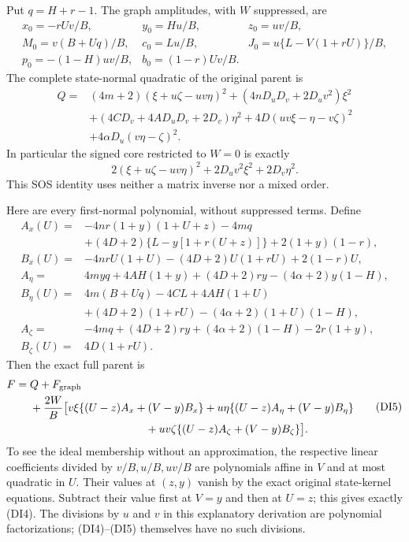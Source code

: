Put $q=H+r-1$.  The graph amplitudes, with $W$ suppressed, are
\[
\begin{array}{lll}
 x_0=-rUv/B,&y_0=Hu/B,&z_0=uv/B,\\
 M_0=v(B+Uq)/B,&c_0=Lu/B,&J_0=u\{L-V(1+rU)\}/B,\\
 p_0=-(1-H)uv/B,&b_0=(1-r)Uv/B.&
\end{array}                                                   \tag{DI2}
\]
The complete state-normal quadratic of the original parent is
\[
\begin{split}
 Q={}&(4m+2)(\xi+u\zeta-uv\eta)^2
 +(4nD_uD_v+2D_uv^2)\xi^2\\
 &+(4CD_v+4AD_uD_v+2D_v)\eta^2
 +4D(uv\xi-\eta-v\zeta)^2\\
 &+4\alpha D_u(v\eta-\zeta)^2.
\end{split}                                  \tag{DI3}
\]
In particular the signed core restricted to $W=0$ is exactly
\[
 2(\xi+u\zeta-uv\eta)^2+2D_uv^2\xi^2+2D_v\eta^2.
\]
This SOS identity uses neither a matrix inverse nor a mixed order.

Here are every first-normal polynomial, without suppressed terms.
Define
\[
\begin{split}
 A_x(U)={}&-4nr(1+y)(1+U+z)-4mq\\
 &+(4D+2)\{L-y[1+r(U+z)]\}+2(1+y)(1-r),\\
 B_x(U)={}&-4nrU(1+U)-(4D+2)U(1+rU)+2(1-r)U,\\
 A_\eta={}&4myq+4AH(1+y)+(4D+2)ry-(4\alpha+2)y(1-H),\\
 B_\eta(U)={}&4m(B+Uq)-4CL+4AH(1+U)\\
 &+(4D+2)(1+rU)-(4\alpha+2)(1+U)(1-H),\\
 A_\zeta={}&-4mq+(4D+2)ry+(4\alpha+2)(1-H)-2r(1+y),\\
 B_\zeta(U)={}&4D(1+rU).
\end{split}                                                    \tag{DI4}
\]
Then the exact full parent is
\[
\begin{split}
 F={}&Q+F_{\rm graph}\\
 &+\frac{2W}{B}\bigl[
 v\xi\{(U-z)A_x+(V-y)B_x\}
 +u\eta\{(U-z)A_\eta+(V-y)B_\eta\}\\
 &\hspace{37mm}+uv\zeta\{(U-z)A_\zeta+(V-y)B_\zeta\}\bigr].
                                                               \end{split} \tag{DI5}
\]
To see the ideal membership without an approximation, the respective
linear coefficients divided by $v/B,u/B,uv/B$ are polynomials affine
in $V$ and at most quadratic in $U$.  Their values at $(z,y)$ vanish
by the exact original state-kernel equations.  Subtract their value
first at $V=y$ and then at $U=z$; this gives exactly (DI4).  The
divisions by $u$ and $v$ in this explanatory derivation are polynomial
factorizations; (DI4)--(DI5) themselves have no such divisions.

